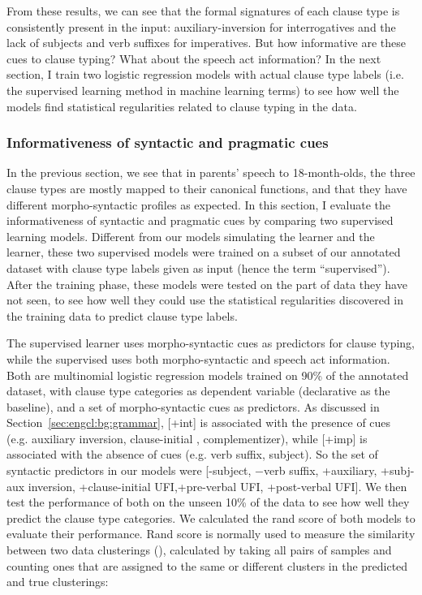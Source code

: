 From these results, we can see that the formal signatures of each clause type is consistently present in the input: auxiliary-inversion for interrogatives and the lack of subjects and verb suffixes for imperatives. But how informative are these cues to clause typing? What about the speech act information? In the next section, I train two logistic regression models with actual clause type labels (i.e. the supervised learning method in machine learning terms) to see how well the models find statistical regularities related to clause typing in the data. 


\subsubsection{Informativeness of syntactic and pragmatic cues}
\label{sec:engcl:corpus:supervised}
In the previous section, we see that in parents' speech to 18-month-olds, the three clause types are mostly mapped to their canonical functions, and that they have different morpho-syntactic profiles as expected. In this section, I evaluate the informativeness of syntactic and pragmatic cues by comparing two supervised learning models. Different from our models simulating the \dlearnerabbr{} learner and the \plearnerabbr{} learner, these two supervised models were trained on a subset of our annotated dataset with clause type labels given as input (hence the term ``supervised''). After the training phase, these models were tested on the part of data they have not seen, to see how well they could use the statistical regularities discovered in the training data to predict clause type labels. 

The supervised \dlearnerabbr{} learner uses morpho-syntactic cues as predictors for clause typing, while the supervised \plearnerabbr{} uses both morpho-syntactic and speech act information. Both are multinomial logistic regression models trained on 90\% of the annotated dataset, with clause type categories as dependent variable (declarative as the baseline), and a set of morpho-syntactic cues as predictors. As discussed in Section~\ref{sec:engcl:bg:grammar}, [+int] is associated with the presence of cues (e.g. auxiliary inversion, clause-initial \twh{}, complementizer), while [+imp] is associated with the absence of cues (e.g. verb suffix, subject). So the set of syntactic predictors in our models were [-subject, $-$verb suffix, +auxiliary, +subj-aux inversion, +clause-initial UFI,+pre-verbal UFI, +post-verbal UFI]. We then test the performance of both on the unseen 10\% of the data to see how well they predict the clause type categories. We calculated the rand score of both models to evaluate their performance. Rand score is normally used to measure the similarity between two data clusterings (\cite{rand1971}), calculated by taking all pairs of samples and counting ones that are assigned to the same or different clusters in the predicted and true clusterings:


